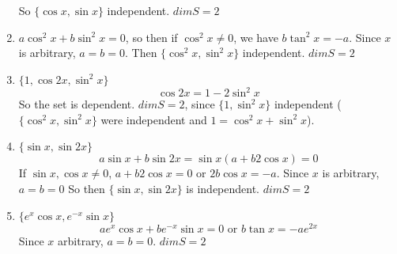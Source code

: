 \documentclass[twoside]{amsart}
\theoremstyle{plain}
\theoremstyle{definition}
\begin{document}
\begin{enumerate}
So $\{ \cos{x}, \sin{x} \}$ independent.  $\boxed{ dim{S} = 2}$
\item $a \cos^2{x} + b\sin^2{x} = 0$, so then if $\cos^2{x} \neq 0$, we have $b\tan^2{x} = -a$.  Since $x$ is arbitrary, $a=b=0$.  Then $\{ \cos^2{x}, \sin^2{x} \}$ independent.  $\boxed{ dim{S} = 2}$
\item $\{ 1, \cos{2x}, \sin^2{x} \}$ 
\[
\cos{2x} = 1 - 2\sin^2{x}
\]
So the set is dependent.  $\boxed{ dim{S} = 2}$, since $\{ 1, \sin^2{x} \}$ independent ($\{ \cos^2{x}, \sin^2{x} \}$ were independent and $1= \cos^2{x} + \sin^2{x}$).  
\item $\{ \sin{x}, \sin{2x} \}$
\[
a\sin{x} + b \sin{2x} = \sin{x} (a+b2\cos{x}) =0 
\]
If $\sin{x}, \cos{x} \neq 0$, $a+b2\cos{x} =0$ or $2b\cos{x} = -a$.  Since $x$ is arbitrary, $a=b=0$  So then $\{ \sin{x},\sin{2x} \}$ is independent.  $\boxed{ dim{S} =2}$
\item $\{ e^x \cos{x}, e^{-x} \sin{x} \}$
\[
ae^x \cos{x} + be^{-x} \sin{x} = 0 \text{ or } b \tan{x} = -a e^{2x}
\]
Since $x$ arbitrary, $a=b=0$.  $\boxed{ dim{S} =2} $
\end{enumerate}
\end{document}
